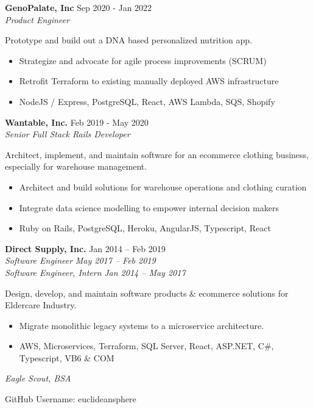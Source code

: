 \documentclass[line,margin]{res}
\begin{document}
\begin{resume}
\textbf{GenoPalate, Inc} \hfill Sep 2020 - Jan 2022 \\
{\sl Product Engineer}

Prototype and build out a DNA based personalized nutrition app.

\begin{itemize}
\item Strategize and advocate for agile process improvements (SCRUM)
\item Retrofit Terraform to existing manually deployed AWS infrastructure
\item NodeJS / Express, PostgreSQL, React, AWS Lambda, SQS, Shopify
\end{itemize}

\textbf{Wantable, Inc.} \hfill Feb 2019 - May 2020 \\
{\sl Senior Full Stack Rails Developer}

Architect, implement, and maintain software for an ecommerce clothing business, especially for warehouse management.

\begin{itemize}
\item Architect and build solutions for warehouse operations and clothing curation
\item Integrate data science modelling to empower internal decision makers
\item Ruby on Rails, PostgreSQL, Heroku, AngularJS, Typescript, React
\end{itemize}

\textbf{Direct Supply, Inc.} \hfill Jan 2014 -- Feb 2019 \\
{\sl Software Engineer} \hfill {\sl May 2017 -- Feb 2019} \\
{\sl Software Engineer, Intern} \hfill {\sl Jan 2014 -- May 2017}

Design, develop, and maintain software products \& ecommerce solutions for Eldercare Industry.

\begin{itemize}
\item Migrate monolithic legacy systems to a microservice architecture. 
\item AWS, Microservices, Terraform, SQL Server, React, ASP.NET, C\#, Typescript, VB6 \& COM
\end{itemize}




{\sl Eagle Scout, BSA}

GitHub Username: euclideansphere

\end{resume}
\end{document}
